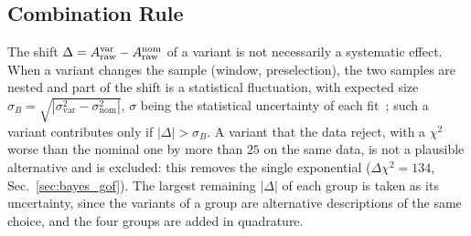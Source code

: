 \subsection{Combination Rule}
The shift $\Delta=A_{\mathrm{raw}}^{\mathrm{var}}-A_{\mathrm{raw}}^{\mathrm{nom}}$ of a variant is not necessarily a systematic effect. When a variant changes the sample (window, preselection), the two samples are nested and part of the shift is a statistical fluctuation, with expected size $\sigma_B=\sqrt{|\sigma_{\mathrm{var}}^2-\sigma_{\mathrm{nom}}^2|}$, $\sigma$ being the statistical uncertainty of each fit~\cite{barlow}; such a variant contributes only if $|\Delta|>\sigma_B$. A variant that the data reject, with a $\chi^2$ worse than the nominal one by more than $25$ on the same data, is not a plausible alternative and is excluded: this removes the single exponential ($\Delta\chi^2=134$, Sec.~\ref{sec:bayes_gof}). The largest remaining $|\Delta|$ of each group is taken as its uncertainty, since the variants of a group are alternative descriptions of the same choice, and the four groups are added in quadrature.

